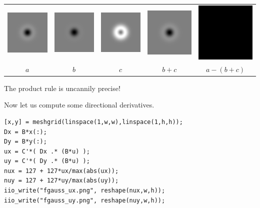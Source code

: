 \begin{tabular}{ccccc}
	\includegraphics{fgauss_a.png} &
	\includegraphics{fgauss_b.png} &
	\includegraphics{fgauss_c.png} &
	\includegraphics{fgauss_bpc.png} &
	\includegraphics{fgauss_err.png}\\
	$a$ &
	$b$ &
	$c$ &
	$b+c$ &
	$a-(b+c)$
\end{tabular}

The product rule is uncannily precise!


Now let us compute some directional derivatives.

\begin{verbatim}
[x,y] = meshgrid(linspace(1,w,w),linspace(1,h,h));
Dx = B*x(:);
Dy = B*y(:);
ux = C'*( Dx .* (B*u) );
uy = C'*( Dy .* (B*u) );
nux = 127 + 127*ux/max(abs(ux));
nuy = 127 + 127*uy/max(abs(uy));
iio_write("fgauss_ux.png", reshape(nux,w,h));
iio_write("fgauss_uy.png", reshape(nuy,w,h));
\end{verbatim}

